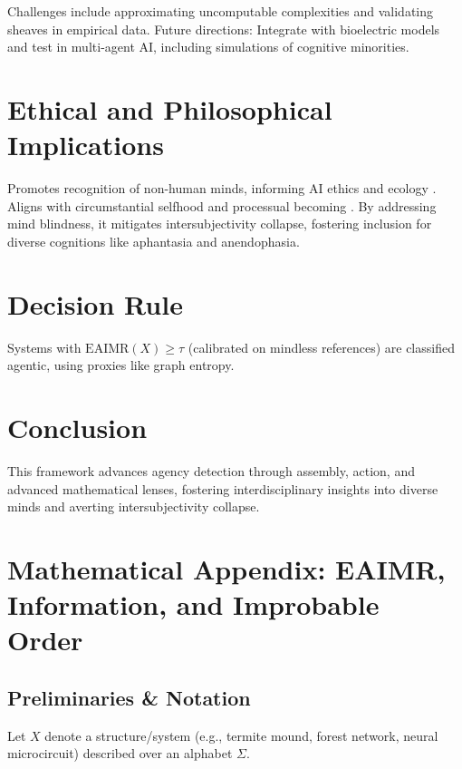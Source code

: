 \documentclass{article}
\begin{document}
Challenges include approximating uncomputable complexities and validating sheaves in empirical data. Future directions: Integrate with bioelectric models \citep{levin2019} and test in multi-agent AI, including simulations of cognitive minorities.

\section{Ethical and Philosophical Implications}
\label{sec:ethics}

Promotes recognition of non-human minds, informing AI ethics and ecology \citep{dennett1987}. Aligns with circumstantial selfhood \citep{ortega1961} and processual becoming \citep{whitehead1929, deleuze1987}. By addressing mind blindness, it mitigates intersubjectivity collapse, fostering inclusion for diverse cognitions like aphantasia and anendophasia.

\section{Decision Rule}
\label{sec:decision}

Systems with \(\text{EAIMR}(X) \geq \tau\) (calibrated on mindless references) are classified agentic, using proxies like graph entropy.

\section{Conclusion}
\label{sec:conclusion}

This framework advances agency detection through assembly, action, and advanced mathematical lenses, fostering interdisciplinary insights into diverse minds and averting intersubjectivity collapse.

\appendix

\section{Mathematical Appendix: EAIMR, Information, and Improbable Order}
\label{app:math}

\subsection{Preliminaries \& Notation}

Let \(X\) denote a structure/system (e.g., termite mound, forest network, neural microcircuit) described over an alphabet \(\Sigma\).
\end{document}
